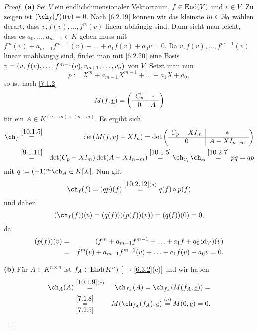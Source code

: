 \documentclass[../../main.tex]{subfiles}
\begin{document}
\begin{proof}
\textbf{(a)} Sei $V$ ein endlichdimensionaler Vektorraum, $f\in\operatorname{End}(V)$ und $v\in V$. Zu zeigen ist $(\ch_f(f))(v)=0$. Nach \ref{6.2.19} können wir das kleinste $m\in\mathbb N_0$ wählen derart, dass $v,f(v),\dots,f^m(v)$ linear abhängig sind. Dann sieht man leicht, dass es $a_0,\dots,a_{m-1}\in K$ geben muss mit
$f^m(v)+a_{m-1}f^{m-1}(v)+\ldots+a_1f(v)+a_0v=0$. Da $v,f(v),\dots,f^{m-1}(v)$ linear unabhängig sind, findet man mit \ref{6.2.20} eine Basis ${\underline v}=(v,f(v),\dots,f^{m-1}(v),v_{m+1},\dots,v_n)$
von $V$. Setzt man nun \[p:=X^m+a_{m-1}X^{m-1}+\ldots+a_1X+a_0,\] so ist nach \ref{7.1.2}
\[M(f,{\underline v})=
\left(
\begin{array}{c|c}
C_p&*\\
\hline
0&A
\end{array}
\right)\]
für ein $A\in K^{(n-m)\times(n-m)}$. Es ergibt sich
\begin{eqnarray*}
\ch_f&\overset{\ref{10.1.5}}=&\det(M(f,\v)-XI_n)=\det\left(
\begin{array}{c|c}
C_p-XI_m&*\\
\hline
0&A-XI_{n-m}
\end{array}\right)\\
&\overset{\ref{9.1.11}}=&\det(C_p-XI_m)\det(A-XI_{n-m})\overset{\ref{10.1.5}}=\ch_{\scriptscriptstyle C_p}\ch_A\overset{\ref{10.2.7}}=pq=qp
\end{eqnarray*}
mit $q:=(-1)^m\ch_A\in K[X]$. Nun gilt \[\ch_f(f)=(qp)(f)\overset{\ref{10.2.12}(a)}=q(f)\circ p(f)\] und daher
 \[(\ch_f(f))(v)=(q(f))((p(f))(v))=(q(f))(0)=0,\] da
 \begin{eqnarray*}
(p(f))(v)&=&(f^m+a_{m-1}f^{m-1}+\ldots+a_1f+a_0\operatorname{id}_V)(v)\\
&=&f^m(v)+a_{m-1}f^{m-1}(v)+\ldots+a_1f(v)+a_0v=0.
\end{eqnarray*}

\medskip\noindent
\textbf{(b)} Für $A\in K^{n\times n}$ ist $f_A\in\operatorname{End}(K^n)$ [$\to$\ref{6.3.2}(e)] und wir haben
\begin{eqnarray*}
\ch_A(A)&\overset{\ref{10.1.9}(e)}=&\ch_{f_A}(A)=\ch_{f_A}(M(f_A,\e))=\\
&\overset{\ref{7.1.8}}{\underset{\ref{7.2.5}}=}&M(\ch_{f_A}(f_A),\e)\overset{(a)}=M(0,\e)=0.
\end{eqnarray*}
\end{proof}
\end{document}
